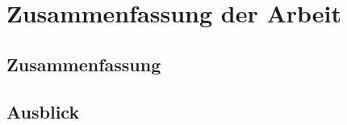 \chapter{Zusammenfassung der Arbeit}
\label{c:zsm}



\section{Zusammenfassung}
\label{s:zusammenfassung}


\section{Ausblick}
\label{s:ausblick}


















